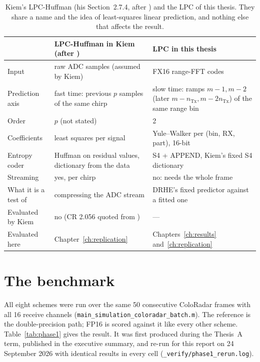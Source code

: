 \begin{table}[htbp]
\centering
\caption[Two methods called LPC]{Kiem's LPC-Huffman (his Section~2.7.4,
after \cite{meucci2022}) and the LPC of this thesis. They share a name and the idea of
least-squares linear prediction, and nothing else that affects the result.}
\label{tab:lpc_vs_kiemlpc}
\small
\begin{tabular}{@{}p{33mm}p{50mm}p{50mm}@{}}
\toprule
& \textbf{LPC-Huffman in Kiem (after \cite{meucci2022})} & \textbf{LPC in this thesis}\\
\midrule
Input & raw ADC samples (assumed by Kiem) & FX16 range-FFT codes\\
Prediction axis & fast time: previous $p$ samples of the same chirp & slow time: ramps $m-1, m-2$ (later $m-n_{\mathrm{Tx}}, m-2n_{\mathrm{Tx}}$) of the same range bin\\
Order & $p$ (not stated) & 2\\
Coefficients & least squares per signal & Yule--Walker per (bin, RX, part), 16-bit\\
Entropy coder & Huffman on residual values, dictionary from the data & S4 + APPEND, Kiem's fixed S4 dictionary\\
Streaming & yes, per chirp & no: needs the whole frame\\
What it is a test of & compressing the ADC stream & DRHE's fixed predictor against a fitted one\\
Evaluated by Kiem & no (CR 2.056 quoted from \cite{meucci2022}) & ---\\
Evaluated here & Chapter~\ref{ch:replication} & Chapters~\ref{ch:results} and~\ref{ch:replication}\\
\bottomrule
\end{tabular}
\end{table}

\section{The benchmark}
\label{sec:jr_bench}

All eight schemes were run over the same 50 consecutive ColoRadar frames with
all 16 receive channels (\texttt{main\_simulation\_coloradar\_batch.m}). The
reference is the double-precision path; FP16 is scored against it like every
other scheme. Table~\ref{tab:phase1} gives the result. It was first produced during the
Thesis~A term, published in the executive summary, and re-run for this report on
24 September 2026 with identical results in every cell
(\texttt{\_verify/phase1\_rerun.log}).

